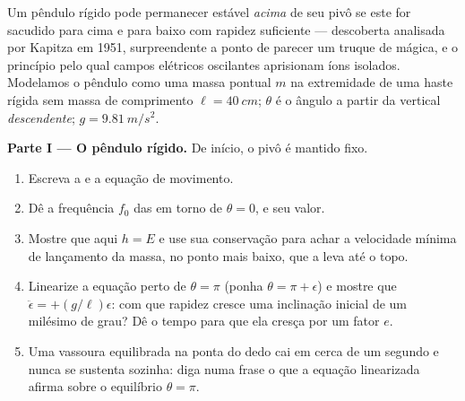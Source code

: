 \begin{problem}\label{pb:b3:lagrangian-mechanics:1}
Um pêndulo rígido pode permanecer estável \emph{acima} de seu pivô se
este for sacudido para cima e para baixo com rapidez suficiente ---
descoberta analisada por Kapitza em 1951, surpreendente a ponto de
parecer um truque de mágica, e o princípio pelo qual campos elétricos
oscilantes aprisionam íons isolados. Modelamos o pêndulo como uma massa
pontual $m$ na extremidade de uma haste rígida sem massa de comprimento
$\ell = \qty{40}{cm}$; $\theta$ é o ângulo a partir da vertical
\emph{descendente}; $g = \qty{9.81}{m/s^2}$.

\medskip\noindent\textbf{Parte I --- O pêndulo rígido.}
De início, o pivô é mantido fixo.
\begin{enumerate}
  \item Escreva a  e a equação de movimento.
  \item Dê a frequência $f_0$ das  em torno de $\theta =
        0$, e seu valor.
  \item Mostre que aqui $h = E$ e use sua conservação para achar a
        velocidade mínima de lançamento da massa, no ponto mais baixo,
        que a leva até o topo.
  \item Linearize a equação perto de $\theta = \pi$ (ponha $\theta = \pi +
        \epsilon$) e mostre que $\ddot\epsilon = +(g/\ell)\epsilon$:
        com que rapidez cresce uma inclinação inicial de um milésimo
        de grau? Dê o tempo para que ela cresça por um fator $e$.
  \item Uma vassoura equilibrada na ponta do dedo cai em cerca de um
        segundo e nunca se sustenta sozinha: diga numa frase o que a
        equação linearizada afirma sobre o equilíbrio $\theta = \pi$.
\end{enumerate}


\end{problem}
